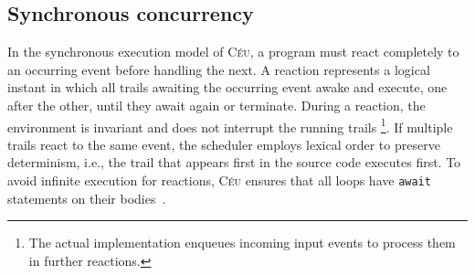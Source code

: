 \documentclass{acm_proc_article-sp}
\newcommand{\CEU}{\textsc{C\'{e}u}\xspace}
\newcommand{\code}[1] {{\small{\texttt{#1}}}}
\newcommand{\1}{\;}
\newcommand{\2}{\;\;}
\newcommand{\3}{\;\;\;}
\newcommand{\5}{\;\;\;\;\;}
\begin{document}

\subsection{Synchronous concurrency}
\label{sec.ceu.sync}

In the synchronous execution model of \CEU, a program must react completely to 
an occurring event before handling the next.
%
A reaction represents a logical instant in which all trails awaiting the 
occurring event awake and execute, one after the other, until they await again 
or terminate.
%
During a reaction, the environment is invariant and does not interrupt the 
running trails%
\footnote{
The actual implementation enqueues incoming input events to process them in 
further reactions.
}.
If multiple trails react to the same event, the scheduler employs lexical order 
to preserve determinism, i.e., the trail that appears first in the source code 
executes first.
%
To avoid infinite execution for reactions, \CEU ensures that all loops have 
\code{await} statements on their bodies~\cite{ceu.sensys13}.
\end{document}
